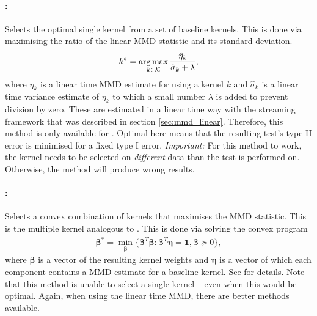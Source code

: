 \paragraph{:} Selects the optimal single kernel from a set of baseline kernels. This is done via maximising the ratio of the linear MMD statistic and its standard deviation.
\begin{align*}
k^*=\operatorname*{arg\,max}_{k\in\mathcal{K}} \frac{\hat \eta_k}{\hat\sigma_k+\lambda},
\end{align*}
where $\eta_k$ is a linear time MMD estimate for using a kernel $k$ and $\hat\sigma_k$ is a linear time variance estimate of $\eta_k$ to which a small number $\lambda$ is added to prevent division by zero.
These are estimated in a linear time way with the streaming framework that was described in section \ref{sec:mmd_linear}. Therefore, this method is only available for . Optimal here means that the resulting test's type II error is minimised for a fixed type I error. \emph{Important:} For this method to work, the kernel needs to be selected on \emph{different} data than the test is performed on. Otherwise, the method will produce wrong results.
 
\paragraph{:} Selects a convex combination of kernels that maximises the MMD statistic. This is the multiple kernel analogous to . This is done via solving the convex program
\begin{align*}
\boldsymbol{\beta}^*=\min_{\boldsymbol{\beta}} \{\boldsymbol{\beta}^T\boldsymbol{\beta}  :  \boldsymbol{\beta}^T\boldsymbol{\eta}=\mathbf{1}, \boldsymbol{\beta}\succeq 0\},
\end{align*}
where $\boldsymbol{\beta}$ is a vector of the resulting kernel weights and $\boldsymbol{\eta}$ is a vector of which each component contains a MMD estimate for a baseline kernel. See \citep{Gretton2012a} for details. Note that this method is unable to select a single kernel -- even when this would be optimal.
Again, when using the linear time MMD, there are better methods available.

